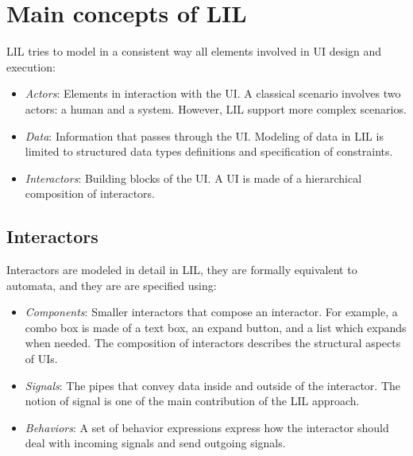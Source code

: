 \documentclass{sigchi}
\begin{document}
\section{Main concepts of LIL}

LIL tries to model in a consistent way all elements involved in UI design and execution:
\begin{itemize}
\item \textit{Actors}: Elements in interaction with the UI. A classical scenario involves two actors: a human and a system. However, LIL support more complex scenarios. 
\item \textit{Data}: Information that passes through the UI. Modeling of data in LIL is limited to structured data types definitions and specification of constraints.
\item \textit{Interactors}: Building blocks of the UI. A UI is made of a hierarchical composition of interactors.
\end{itemize}

\subsection{Interactors}
Interactors are modeled in detail in LIL, they are formally equivalent to automata, and they are are specified using:
\begin{itemize}
\item \textit{Components}: Smaller interactors that compose an interactor. For example, a combo box is made of a text box, an expand button, and a list which expands when needed. The composition of interactors describes the structural aspects of UIs.
\item \textit{Signals}: The pipes that convey data inside and outside of the interactor. The notion of signal is one of the main contribution of the LIL approach. 
\item \textit{Behaviors}: A set of behavior expressions express how the interactor should deal with incoming signals and send outgoing signals. 
\end{itemize}
\end{document}
